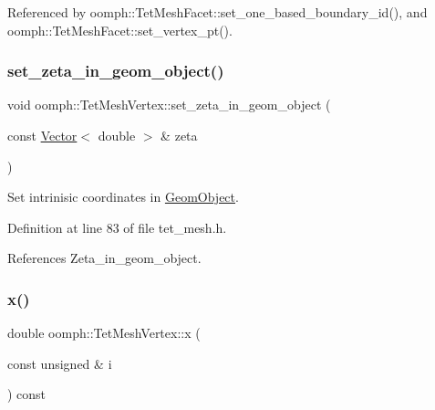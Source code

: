 Referenced by oomph\+::\+Tet\+Mesh\+Facet\+::set\+\_\+one\+\_\+based\+\_\+boundary\+\_\+id(), and oomph\+::\+Tet\+Mesh\+Facet\+::set\+\_\+vertex\+\_\+pt().

\mbox{\label{classoomph_1_1TetMeshVertex_a25bf54df192efe3bdb74bc67983dea34}} 
\subsubsection{\texorpdfstring{set\+\_\+zeta\+\_\+in\+\_\+geom\+\_\+object()}{set\_zeta\_in\_geom\_object()}}
{\footnotesize\ttfamily void oomph\+::\+Tet\+Mesh\+Vertex\+::set\+\_\+zeta\+\_\+in\+\_\+geom\+\_\+object (\begin{DoxyParamCaption}\item[{const \hyperlink{classoomph_1_1Vector}{Vector}$<$ double $>$ \&}]{zeta }\end{DoxyParamCaption})\hspace{0.3cm}{\ttfamily [inline]}}



Set intrinisic coordinates in \hyperlink{classoomph_1_1GeomObject}{Geom\+Object}. 



Definition at line 83 of file tet\+\_\+mesh.\+h.



References Zeta\+\_\+in\+\_\+geom\+\_\+object.

\mbox{\label{classoomph_1_1TetMeshVertex_af579c7e0bb184bc2d67aa31f25872a2b}} 
\subsubsection{\texorpdfstring{x()}{x()}}
{\footnotesize\ttfamily double oomph\+::\+Tet\+Mesh\+Vertex\+::x (\begin{DoxyParamCaption}\item[{const unsigned \&}]{i }\end{DoxyParamCaption}) const\hspace{0.3cm}{\ttfamily [inline]}}



